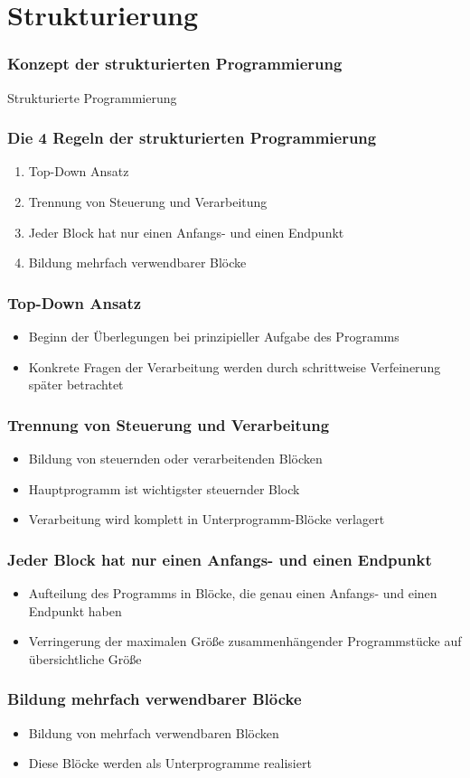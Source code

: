 
\section{Strukturierung}
\begin{frame}
\frametitle{Konzept der strukturierten Programmierung}
	\huge Strukturierte Programmierung
\end{frame}

\begin{frame}
\frametitle{Die 4 Regeln der strukturierten Programmierung}
	\begin{enumerate}
		\item Top-Down Ansatz
		\item Trennung von Steuerung und Verarbeitung
		\item Jeder Block hat nur einen Anfangs- und einen Endpunkt
		\item Bildung mehrfach verwendbarer Blöcke
	\end{enumerate}
\end{frame}

\begin{frame}
\frametitle{Top-Down Ansatz}
	\begin{itemize}
	  \item Beginn der Überlegungen bei prinzipieller Aufgabe des Programms
	  \item Konkrete Fragen der Verarbeitung werden durch schrittweise Verfeinerung
	  später betrachtet
	\end{itemize}
\end{frame}

\begin{frame}
\frametitle{Trennung von Steuerung und Verarbeitung}
	\begin{itemize}
	  \item Bildung von steuernden oder verarbeitenden Blöcken
	  \item Hauptprogramm ist wichtigster steuernder Block
	  \item Verarbeitung wird komplett in Unterprogramm-Blöcke verlagert
	\end{itemize}
\end{frame}

\begin{frame}
\frametitle{Jeder Block hat nur einen Anfangs- und einen Endpunkt}
	\begin{itemize}
	  \item Aufteilung des Programms in Blöcke, die genau einen Anfangs- und einen
	  Endpunkt haben
	  \item Verringerung der maximalen Größe zusammenhängender Programmstücke auf
	  übersichtliche Größe
	\end{itemize}
\end{frame}

\begin{frame}
\frametitle{Bildung mehrfach verwendbarer Blöcke}
	\begin{itemize}
	  \item Bildung von mehrfach verwendbaren Blöcken
	  \item Diese Blöcke werden als Unterprogramme realisiert
	\end{itemize}
\end{frame}